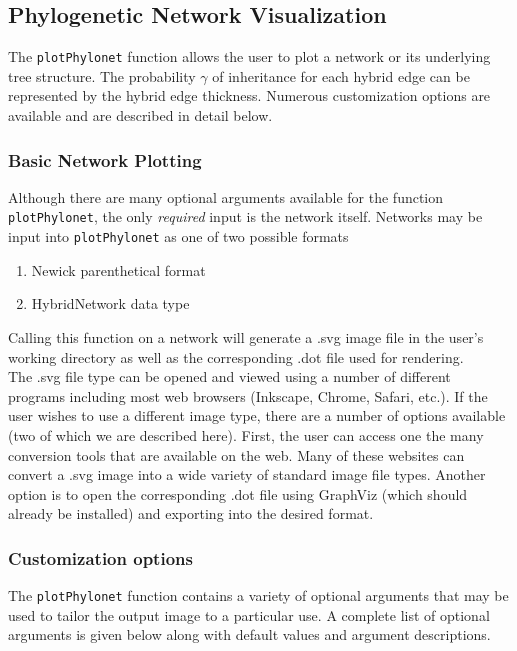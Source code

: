 \documentclass[12pt]{article}
\begin{document}
\subsection{Phylogenetic Network Visualization}
\label{sectPlot}

The \texttt{plotPhylonet} function allows the user to plot a network
or its underlying tree structure.  The probability $\gamma$ of
inheritance for each hybrid edge can be represented by the hybrid edge
thickness.  Numerous customization options are available and are
described in detail below.

\subsubsection{Basic Network Plotting}

Although there are many optional arguments available for the function
\texttt{plotPhylonet}, the only \textit{required} input is the network
itself.  Networks may be input into \texttt{plotPhylonet} as one of
two possible formats
\begin{enumerate}
\item Newick parenthetical format
\item HybridNetwork data type
\end{enumerate}

\noindent Calling this function on a network will generate a .svg image file in the user's working directory
as well as the corresponding .dot file used for rendering. \\

\noindent The .svg file type can be opened and viewed using a number
of different programs including most web browsers (Inkscape, Chrome,
Safari, etc.).  If the user wishes to use a different image type,
there are a number of options available (two of which we are described
here).  First, the user can access one the many conversion tools that
are available on the web. Many of these websites can convert a .svg
image into a wide variety of standard image file types.  Another
option is to open the corresponding .dot file using GraphViz (which
should already be installed) and exporting into the desired format.

\subsubsection{Customization options}

The \texttt{plotPhylonet} function contains a variety of optional arguments that may be used to tailor the output image to a particular use.
A complete list of optional arguments is given below along with default values and argument descriptions.
\end{document}
